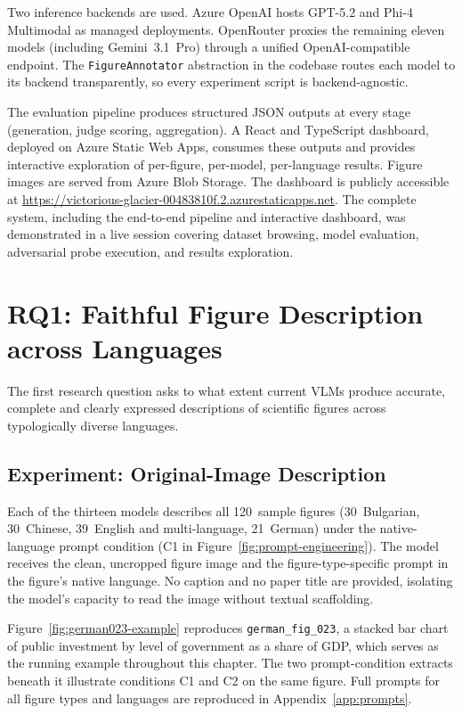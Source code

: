 Two inference backends are used. Azure OpenAI hosts GPT-5.2
and Phi-4 Multimodal as managed deployments. OpenRouter proxies
the remaining eleven models (including Gemini~3.1~Pro) through
a unified OpenAI-compatible endpoint. The
\texttt{FigureAnnotator} abstraction in the codebase routes each
model to its backend transparently, so every experiment script
is backend-agnostic.

\label{sec:impl-infra}
The evaluation pipeline produces structured JSON outputs at
every stage (generation, judge scoring, aggregation). A React
and TypeScript dashboard, deployed on Azure Static Web Apps,
consumes these outputs and provides interactive exploration of
per-figure, per-model, per-language results. Figure images are
served from Azure Blob Storage. The dashboard is publicly
accessible at \url{https://victorious-glacier-00483810f.2.azurestaticapps.net}.
The complete system, including the end-to-end pipeline and interactive dashboard, was demonstrated in a live session covering dataset browsing, model evaluation, adversarial probe execution, and results exploration.


\section{RQ1: Faithful Figure Description across Languages}
\label{sec:impl-rq1}

The first research question asks to what extent current VLMs
produce accurate, complete and clearly expressed descriptions
of scientific figures across typologically diverse languages.

\subsection{Experiment: Original-Image Description}
\label{sec:impl-rq1-original}

Each of the thirteen models describes all 120~sample figures
(30~Bulgarian, 30~Chinese, 39~English and multi-language,
21~German) under the native-language prompt condition (C1 in
Figure~\ref{fig:prompt-engineering}). The model receives the
clean, uncropped figure image and the figure-type-specific
prompt in the figure's native language. No caption and no paper
title are provided, isolating the model's capacity to read the
image without textual scaffolding.

Figure~\ref{fig:german023-example} reproduces
\texttt{german\_fig\_023}, a stacked bar chart of public
investment by level of government as a share of GDP, which
serves as the running example throughout this chapter. The
two prompt-condition extracts beneath it illustrate conditions
C1 and C2 on the same figure. Full prompts for all
figure types and languages are reproduced in
Appendix~\ref{app:prompts}.

